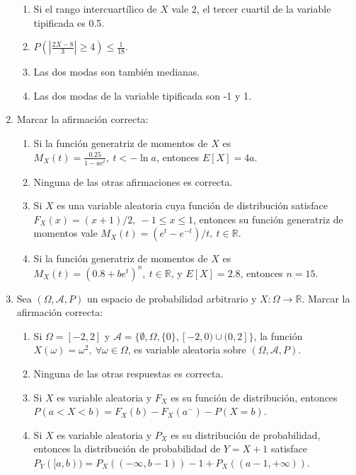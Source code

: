 \documentclass[fleqn]{article}
\begin{document}
\begin{enumerate}
        \begin{enumerate}
          \item Si el rango intercuartílico de $X$ vale 2, el tercer cuartil de la variable tipificada es 0.5.
          \item $P(|\frac{2X - 8}{3}| \ge 4) \le \frac{1}{18}$.
          \item Las dos modas son también medianas.
          \item Las dos modas de la variable tipificada son -1 y 1.
        \end{enumerate}

  \item Marcar la afirmación correcta:

        \begin{enumerate}
          \item Si la función generatriz de momentos de $X$ es $M_X(t) = \frac{0.25}{1 - ae^t},\ t < -\ln{a}$, entonces $E[X] = 4a$.
          \item Ninguna de las otras afirmaciones es correcta.
          \item Si $X$ es una variable aleatoria cuya función de distribución satisface $F_X(x) = (x + 1)/2,\ -1 \le x \le 1$, entonces su función generatriz de momentos vale $M_X(t) = (e^t - e^{-t})/t,\ t \in \mathbb{R}$.
          \item Si la función generatriz de momentos de $X$ es $M_X(t) = (0.8 + be^t)^n,\ t \in \mathbb{R}$, y $E[X] = 2.8$, entonces $n = 15$.
        \end{enumerate}

  \item Sea $(\Omega, \mathcal{A}, P)$ un espacio de probabilidad arbitrario y $X : \Omega \to \mathbb{R}$. Marcar la afirmación correcta:

        \begin{enumerate}
          \item Si $\Omega = [-2, 2]$ y $\mathcal{A} = \{\emptyset, \Omega, \{0\}, [-2, 0) \cup (0,2]\}$, la función $X(\omega) = \omega^2,\ \forall\omega \in \Omega$, es variable aleatoria sobre $(\Omega, \mathcal{A}, P)$.
          \item Ninguna de las otras respuestas es correcta.
          \item Si $X$ es variable aleatoria y $F_X$ es su función de distribución, entonces $P(a < X < b) = F_X(b) - F_X(a^-) - P(X = b)$.
          \item Si $X$ es variable aleatoria y $P_X$ es su distribución de probabilidad, entonces la distribución de probabilidad de $Y = X + 1$ satisface $P_Y([a,b)) = P_X((-\infty, b-1)) - 1 + P_X((a - 1, +\infty))$.
        \end{enumerate}

\end{enumerate}
\end{document}
